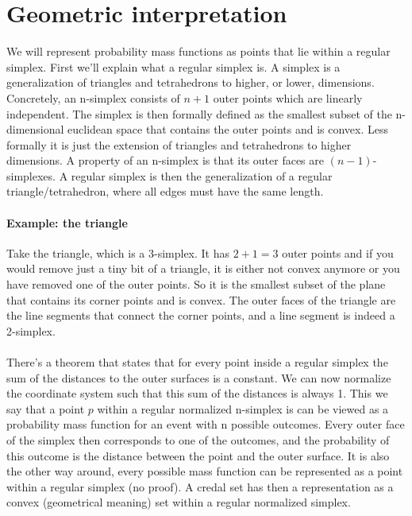 \documentclass{report}
\theoremstyle{definition}
\begin{document}
	\section{Geometric interpretation}
We will represent probability mass functions as points that lie within a regular simplex. First we'll explain what a regular simplex is. A simplex is a generalization of triangles and tetrahedrons to higher, or lower, dimensions. Concretely, an n-simplex consists of $n+1$ outer points which are linearly independent. The simplex is then formally defined as the smallest subset of the n-dimensional euclidean space that contains the outer points and is convex. Less formally it is just the extension of triangles and tetrahedrons to higher dimensions. A property of an n-simplex is that its outer faces are $(n-1)$-simplexes. A regular simplex is then the generalization of a regular triangle/tetrahedron, where all edges must have the same length. 

\paragraph{Example: the triangle}
Take the triangle, which is a 3-simplex. It has $2+1=3$ outer points and if you would remove just a tiny bit of a triangle, it is either not convex anymore or you have removed one of the outer points. So it is the smallest subset of the plane that contains its corner points and is convex. The outer faces of the triangle are the line segments that connect the corner points, and a line segment is indeed a 2-simplex.

\paragraph{}
There's a theorem that states that for every point inside a regular simplex the sum of the distances to the outer surfaces is a constant. We can now normalize the coordinate system such that this sum of the distances is always 1. This we say that a point $p$ within a regular normalized n-simplex is can be viewed as a probability mass function for an event with n possible outcomes. Every outer face of the simplex then corresponds to one of the outcomes, and the probability of this outcome is the distance between the point and the outer surface. It is also the other way around, every possible mass function can be represented as a point within a regular simplex (no proof). A credal set has then a representation as a convex (geometrical meaning) set within a regular normalized simplex.
\end{document}
